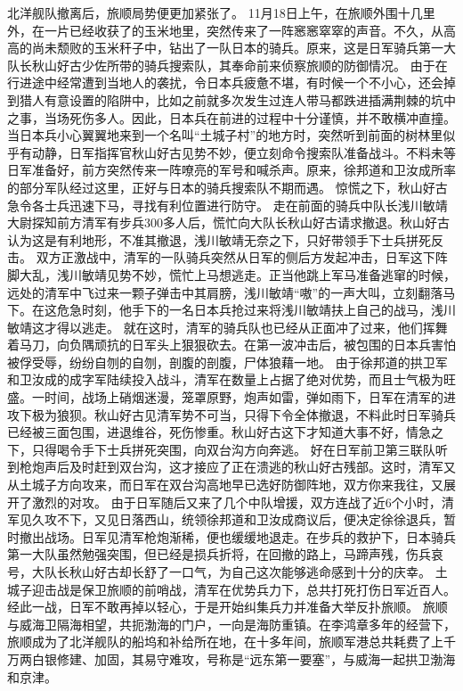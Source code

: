 \documentclass[12pt,UTF8]{ctexbook}
\begin{document}
北洋舰队撤离后，旅顺局势便更加紧张了。
11月18日上午，在旅顺外围十几里外，在一片已经收获了的玉米地里，突然传来了一阵窸窸窣窣的声音。不久，从高高的尚未颓败的玉米秆子中，钻出了一队日本的骑兵。原来，这是日军骑兵第一大队长秋山好古少佐所带的骑兵搜索队，其奉命前来侦察旅顺的防御情况。
由于在行进途中经常遭到当地人的袭扰，令日本兵疲惫不堪，有时候一个不小心，还会掉到猎人有意设置的陷阱中，比如之前就多次发生过连人带马都跌进插满荆棘的坑中之事，当场死伤多人。因此，日本兵在前进的过程中十分谨慎，并不敢横冲直撞。
当日本兵小心翼翼地来到一个名叫“土城子村”的地方时，突然听到前面的树林里似乎有动静，日军指挥官秋山好古见势不妙，便立刻命令搜索队准备战斗。不料未等日军准备好，前方突然传来一阵嘹亮的军号和喊杀声。原来，徐邦道和卫汝成所率的部分军队经过这里，正好与日本的骑兵搜索队不期而遇。
惊慌之下，秋山好古急令各士兵迅速下马，寻找有利位置进行防守。
走在前面的骑兵中队长浅川敏靖大尉探知前方清军有步兵300多人后，慌忙向大队长秋山好古请求撤退。秋山好古认为这是有利地形，不准其撤退，浅川敏靖无奈之下，只好带领手下士兵拼死反击。
双方正激战中，清军的一队骑兵突然从日军的侧后方发起冲击，日军这下阵脚大乱，浅川敏靖见势不妙，慌忙上马想逃走。正当他跳上军马准备逃窜的时候，远处的清军中飞过来一颗子弹击中其肩膀，浅川敏靖“嗷”的一声大叫，立刻翻落马下。在这危急时刻，他手下的一名日本兵抢过来将浅川敏靖扶上自己的战马，浅川敏靖这才得以逃走。
就在这时，清军的骑兵队也已经从正面冲了过来，他们挥舞着马刀，向负隅顽抗的日军头上狠狠砍去。在第一波冲击后，被包围的日本兵害怕被俘受辱，纷纷自刎的自刎，剖腹的剖腹，尸体狼藉一地。
由于徐邦道的拱卫军和卫汝成的成字军陆续投入战斗，清军在数量上占据了绝对优势，而且士气极为旺盛。一时间，战场上硝烟迷漫，笼罩原野，炮声如雷，弹如雨下，日军在清军的进攻下极为狼狈。秋山好古见清军势不可当，只得下令全体撤退，不料此时日军骑兵已经被三面包围，进退维谷，死伤惨重。秋山好古这下才知道大事不好，情急之下，只得喝令手下士兵拼死突围，向双台沟方向奔逃。
好在日军前卫第三联队听到枪炮声后及时赶到双台沟，这才接应了正在溃逃的秋山好古残部。这时，清军又从土城子方向攻来，而日军在双台沟高地早已选好防御阵地，双方你来我往，又展开了激烈的对攻。
由于日军随后又来了几个中队增援，双方连战了近6个小时，清军见久攻不下，又见日落西山，统领徐邦道和卫汝成商议后，便决定徐徐退兵，暂时撤出战场。日军见清军枪炮渐稀，便也缓缓地退走。在步兵的救护下，日本骑兵第一大队虽然勉强突围，但已经是损兵折将，在回撤的路上，马蹄声残，伤兵哀号，大队长秋山好古却长舒了一口气，为自己这次能够逃命感到十分的庆幸。
土城子迎击战是保卫旅顺的前哨战，清军在优势兵力下，总共打死打伤日军近百人。经此一战，日军不敢再掉以轻心，于是开始纠集兵力并准备大举反扑旅顺。
旅顺与威海卫隔海相望，共扼渤海的门户，一向是海防重镇。在李鸿章多年的经营下，旅顺成为了北洋舰队的船坞和补给所在地，在十多年间，旅顺军港总共耗费了上千万两白银修建、加固，其易守难攻，号称是“远东第一要塞”，与威海一起拱卫渤海和京津。
\end{document}
